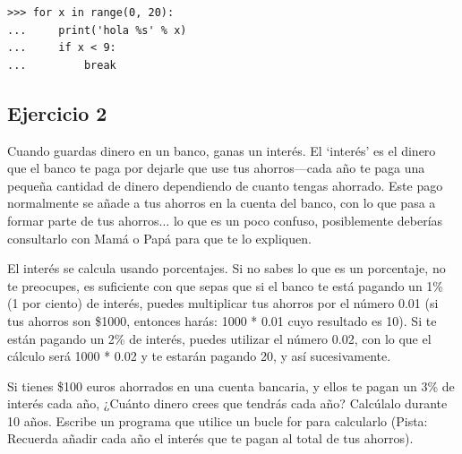\begin{listing}
\begin{verbatim}
>>> for x in range(0, 20):
...     print('hola %s' % x)
...     if x < 9:
...         break
\end{verbatim}
\end{listing}

\subsection*{Ejercicio 2}
Cuando guardas dinero en un banco, ganas un interés.  El `interés' es el dinero que el banco te paga por dejarle que use tus ahorros---cada año te paga una pequeña cantidad de dinero dependiendo de cuanto tengas ahorrado.  Este pago normalmente se añade a tus ahorros en la cuenta del banco, con lo que pasa a formar parte de tus ahorros$\ldots$ lo que es un poco confuso, posiblemente deberías consultarlo con Mamá o Papá para que te lo expliquen.

El interés se calcula usando porcentajes.  Si no sabes lo que es un porcentaje, no te preocupes, es suficiente con que sepas que si el banco te está pagando un 1\% (1 por ciento) de interés, puedes multiplicar tus ahorros por el número 0.01 (si tus ahorros son \$1000, entonces harás: 1000 * 0.01 cuyo resultado es 10). Si te están pagando un 2\% de interés, puedes utilizar el número 0.02, con lo que el cálculo será 1000 * 0.02 y te estarán pagando 20, y así sucesivamente.

Si tienes \$100 euros ahorrados en una cuenta bancaria, y ellos te pagan un 3\% de interés cada año, ¿Cuánto dinero crees que tendrás cada año? Calcúlalo durante 10 años. Escribe un programa que utilice un bucle for para calcularlo (Pista: Recuerda añadir cada año el interés que te pagan al total de tus ahorros). 
\newpage
